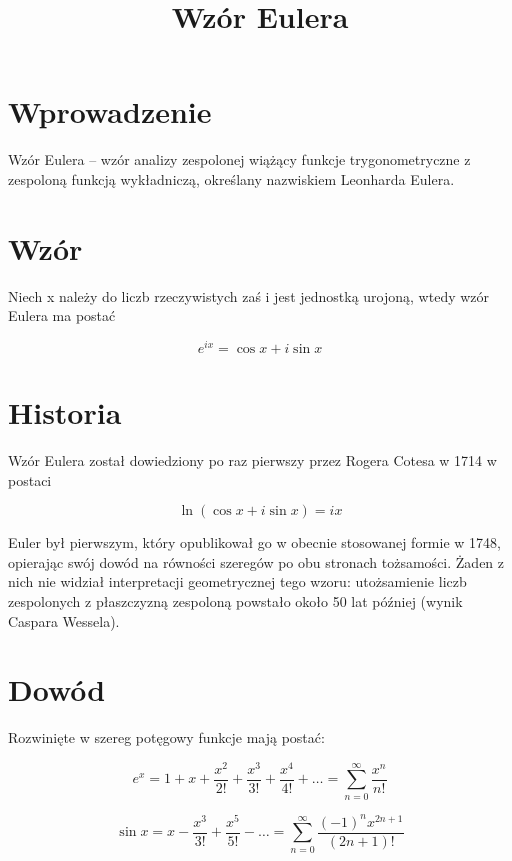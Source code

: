 \documentclass{article}
\begin{document}
\title{Wzór Eulera}
\maketitle

\section*{Wprowadzenie}
Wzór Eulera – wzór analizy zespolonej wiążący funkcje trygonometryczne z zespoloną funkcją wykładniczą, określany nazwiskiem Leonharda Eulera.  

\section*{Wzór}

Niech x należy do liczb rzeczywistych zaś i jest jednostką urojoną, wtedy wzór Eulera ma postać

\[e^{ix}=\cos x+i\sin x\]

\section*{Historia}
Wzór Eulera został dowiedziony po raz pierwszy przez Rogera Cotesa w 1714 w postaci

\begin{equation}
	\ln(\cos x+i\sin x)=ix
\end{equation}

Euler był pierwszym, który opublikował go w obecnie stosowanej formie w 1748, opierając swój dowód na równości szeregów po obu stronach tożsamości. Żaden z nich nie widział interpretacji geometrycznej tego wzoru: utożsamienie liczb zespolonych z płaszczyzną zespoloną powstało około 50 lat później (wynik Caspara Wessela).

\section*{Dowód}
Rozwinięte w szereg potęgowy funkcje mają postać:

\begin{displaymath}
	e^{x}=1+x+{\frac {x^{2}}{2!}}+{\frac {x^{3}}{3!}}+{\frac {x^{4}}{4!}}+\dots =\sum _{n=0}^{\infty }{\frac {x^{n}}{n!}}
\end{displaymath}

\begin{equation*}
	\sin x=x-{\frac {x^{3}}{3!}}+{\frac {x^{5}}{5!}}-\dots =\sum _{n=0}^{\infty }{\frac {(-1)^{n}x^{2n+1}}{(2n+1)!}}
\end{equation*}
\end{document}
